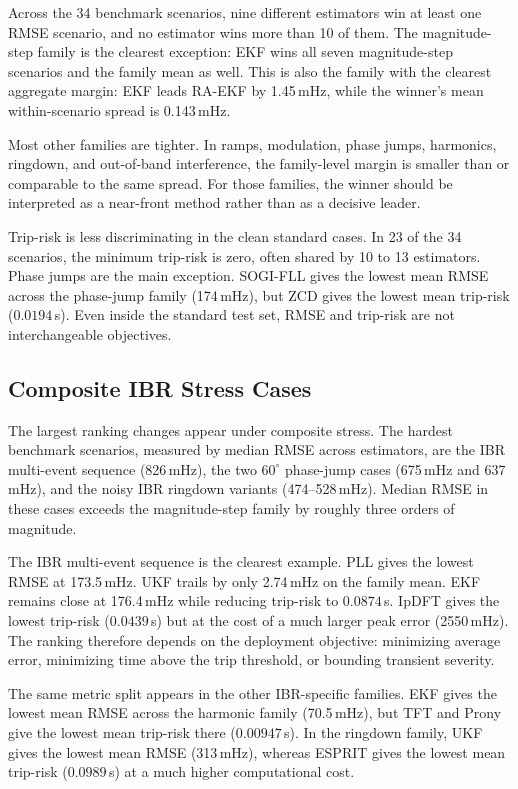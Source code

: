 \documentclass[conference,letterpaper]{IEEEtran}
\begin{document}
Across the 34 benchmark scenarios, nine different estimators win at least one
RMSE scenario, and no estimator wins more than 10 of them. The
magnitude-step family is the clearest exception: EKF wins all seven
magnitude-step scenarios and the family mean as well. This is also the family
with the clearest aggregate margin: EKF leads RA-EKF by 1.45\,mHz, while the
winner's mean within-scenario spread is 0.143\,mHz.

Most other families are tighter. In ramps, modulation, phase jumps, harmonics,
ringdown, and out-of-band interference, the family-level margin is smaller than
or comparable to the same spread. For those families, the winner should be
interpreted as a near-front method rather than as a decisive leader.

Trip-risk is less discriminating in the clean standard cases. In 23 of the 34
scenarios, the minimum trip-risk is zero, often shared by 10 to 13 estimators.
Phase jumps are the main exception. SOGI-FLL gives the lowest mean RMSE across
the phase-jump family (174\,mHz), but ZCD gives the lowest mean trip-risk
($0.0194$\,s). Even inside the standard test set, RMSE and trip-risk are not
interchangeable objectives.

\subsection{Composite IBR Stress Cases}

The largest ranking changes appear under composite stress. The hardest
benchmark scenarios, measured by median RMSE across estimators, are the IBR
multi-event sequence (826\,mHz), the two $60^\circ$ phase-jump cases
(675\,mHz and 637\,mHz), and the noisy IBR ringdown variants
(474--528\,mHz). Median RMSE in these cases exceeds the magnitude-step family
by roughly three orders of magnitude.

The IBR multi-event sequence is the clearest example. PLL gives the lowest
RMSE at 173.5\,mHz. UKF trails by only 2.74\,mHz on the family mean. EKF
remains close at 176.4\,mHz while reducing trip-risk to $0.0874$\,s. IpDFT
gives the lowest trip-risk ($0.0439$\,s) but at the cost of a much larger peak
error (2550\,mHz). The ranking therefore depends on the deployment objective:
minimizing average error, minimizing time above the trip threshold, or bounding
transient severity.

The same metric split appears in the other IBR-specific families. EKF gives the
lowest mean RMSE across the harmonic family (70.5\,mHz), but TFT and Prony
give the lowest mean trip-risk there ($0.00947$\,s). In the ringdown family,
UKF gives the lowest mean RMSE (313\,mHz), whereas ESPRIT gives the lowest
mean trip-risk ($0.0989$\,s) at a much higher computational cost.
\end{document}
